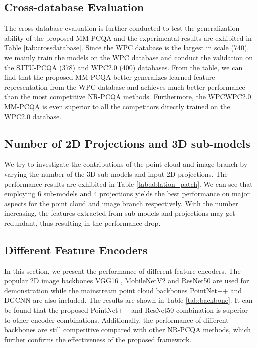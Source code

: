 \documentclass{article}
\begin{document}
\subsection{Cross-database Evaluation}
The cross-database evaluation is further conducted to test the generalization ability of the proposed MM-PCQA and the experimental results are exhibited in Table \ref{tab:crossdatabase}.  Since the WPC database is the largest in scale (740), we mainly train the models on the WPC database and conduct the validation on the SJTU-PCQA (378) and WPC2.0 (400) databases. From the table, we can find that the proposed MM-PCQA better generalizes learned feature representation from the WPC database and achieves much better performance than the most competitive NR-PCQA methods. Furthermore, the WPCWPC2.0 MM-PCQA is even superior to all the competitors directly trained on the WPC2.0 database.








 

\subsection{Number of 2D Projections and 3D sub-models}
We try to investigate the contributions of the point cloud and image branch by varying the number of the 3D sub-models and input 2D projections. The performance results are exhibited in Table \ref{tab:ablation_patch}. We can see that employing 6 sub-models and 4 projections yields the best performance on major aspects for the point cloud and image branch respectively. With the number increasing, the features extracted from sub-models and projections may get redundant, thus resulting in the performance drop. 


\subsection{Different Feature Encoders}

In this section, we present the performance of different feature encoders.
The popular 2D image backbones VGG16 \cite{simonyan2014very}, MobileNetV2 \cite{sandler2018mobilenetv2} and ResNet50 \cite{he2016deep} are used for demonstration while the mainstream point cloud backbones PointNet++ \cite{qi2017pointnet++} and DGCNN \cite{wang2019dynamic} are also included. The results are shown in Table \ref{tab:backbone}. It can be found that the proposed PointNet++ and ResNet50 combination is superior to other encoder combinations. Additionally, the performance of different backbones are still competitive compared with other NR-PCQA methods, which further confirms the effectiveness of the proposed framework. 
\end{document}
